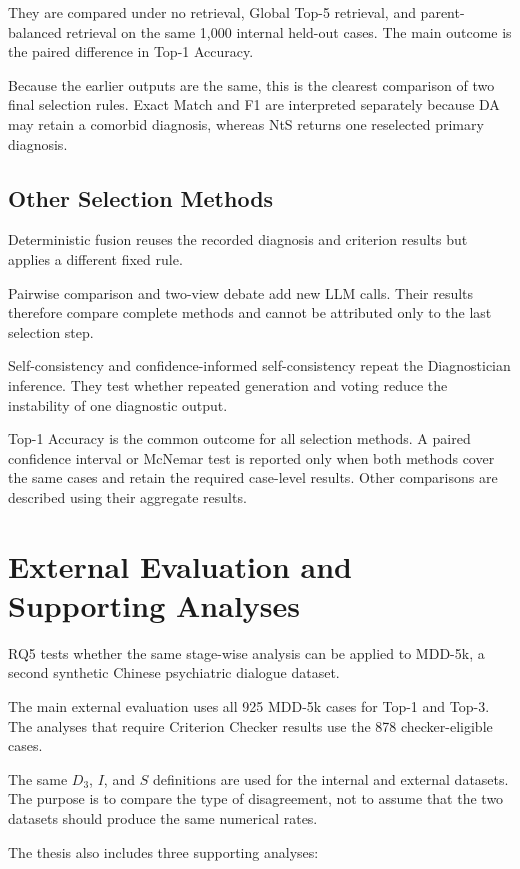 \documentclass[12pt,a4paper,oneside]{report}
\begin{document}
They are compared under no retrieval, Global Top-5 retrieval, and
parent-balanced retrieval on the same 1,000 internal held-out cases.
The main outcome is the paired difference in Top-1 Accuracy.

Because the earlier outputs are the same, this is the clearest
comparison of two final selection rules. Exact Match and F1 are
interpreted separately because DA may retain a comorbid diagnosis,
whereas NtS returns one reselected primary diagnosis.

\subsection{Other Selection Methods}

Deterministic fusion reuses the recorded diagnosis and criterion results
but applies a different fixed rule.

Pairwise comparison and two-view debate add new LLM calls. Their results
therefore compare complete methods and cannot be attributed only to the
last selection step.

Self-consistency and confidence-informed self-consistency repeat the
Diagnostician inference. They test whether repeated generation and voting
reduce the instability of one diagnostic output.

Top-1 Accuracy is the common outcome for all selection methods. A paired
confidence interval or McNemar test is reported only when both methods
cover the same cases and retain the required case-level results. Other
comparisons are described using their aggregate results.

\section{External Evaluation and Supporting Analyses}
\label{sec:sensitivity-transfer-design}

RQ5 tests whether the same stage-wise analysis can be applied to MDD-5k,
a second synthetic Chinese psychiatric dialogue dataset.

The main external evaluation uses all 925 MDD-5k cases for Top-1 and
Top-3. The analyses that require Criterion Checker results use the 878
checker-eligible cases.

The same $D_3$, $I$, and $S$ definitions are used for the internal and
external datasets. The purpose is to compare the type of disagreement,
not to assume that the two datasets should produce the same numerical
rates.

The thesis also includes three supporting analyses:
\end{document}
